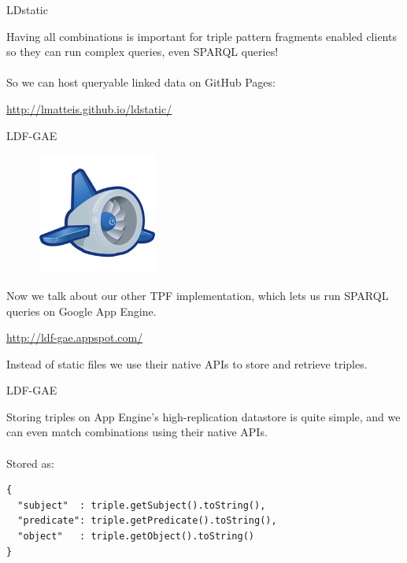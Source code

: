\documentclass[20pt]{extarticle}
\newcommand{\cmr}{\fontencoding{T1}\fontfamily{cmr}\selectfont} %
\begin{document}
{\newpage

\begin{center}
{\fontsize{35}{35}\color{blue} \sc LDstatic}
\end{center}
\vspace{10 mm}
{\fontsize{30}{30} {\cmr 
\noindent Having all combinations is important for triple pattern fragments enabled clients so they can run complex queries, even SPARQL queries!
\\\\
So we can host queryable linked data on GitHub Pages:
\begin{center}
\url{http://lmatteis.github.io/ldstatic/}
\end{center}
}} 



\newpage

\begin{center}
{\fontsize{35}{35}\color{blue} \sc LDF-GAE}
\end{center}
\vspace{10 mm}
\begin{figure}[ht!]
\centering
\includegraphics[width=40mm]{appengine-logo.png}
\end{figure}
{\fontsize{30}{30} {\cmr 
\noindent Now we talk about our other TPF implementation, which lets us run SPARQL queries on {\color{blue}Google App Engine}.

\begin{center}
\url{http://ldf-gae.appspot.com/}
\end{center}

Instead of static files we use their native APIs to store and retrieve triples.
}} 


\newpage

\begin{center}
{\fontsize{35}{35}\color{blue} \sc LDF-GAE}
\end{center}
\vspace{20 mm}

{\fontsize{30}{30} {\cmr 
\noindent Storing triples on App Engine's high-replication datastore is quite simple, and we can even match combinations using their native APIs.
\\ \\
{\color{blue}Stored as:}
}} 
\begin{center}
\begin{small}
\begin{verbatim}
{
  "subject"  : triple.getSubject().toString(),
  "predicate": triple.getPredicate().toString(),
  "object"   : triple.getObject().toString()
}
\end{verbatim}
\end{small}
\end{center}


}
\end{document}
